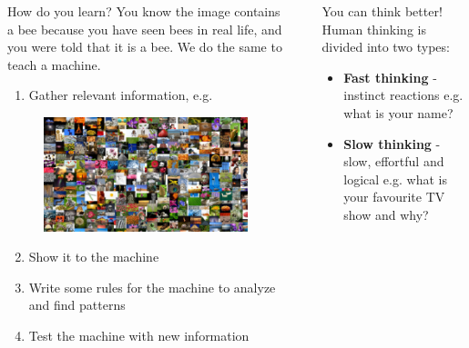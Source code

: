 \documentclass[final]{beamer}
\newlength{\sepwidth}
\newlength{\colwidth}
\newcommand{\separatorcolumn}{\begin{column}{\sepwidth}\end{column}}
\begin{document}
\begin{frame}{}
\begin{columns}[t]
\begin{column}{\colwidth}
    \begin{myblock}{How do you learn?} 
    You know the image contains a bee because you have seen bees in real life, and you were told that it is a bee. We do the same to teach a machine.
    \raggedright
    \begin{enumerate}
        \item Gather relevant information, e.g.
    \end{enumerate}
    \begin{figure}%
        \centering
        \includegraphics[width=\textwidth]{Images/data.jpg}
    \end{figure}
    \vspace{-0.5cm}
    \begin{enumerate}
        \setcounter{enumi}{1}
        \item Show it to the machine
        \item Write some rules for the machine to analyze and find patterns
        \item Test the machine with new information
    \end{enumerate}
    \end{myblock}
  
\end{column}
    
\separatorcolumn
\begin{column}{\colwidth}
    \vspace{-2cm}
    \begin{myblock}{You can think better!}
    Human thinking is divided into two types:
    \begin{itemize}
      \item \textbf{Fast thinking} - instinct reactions e.g. what is your name?
      \item \textbf{Slow thinking} - slow, effortful and logical e.g. what is your favourite TV show and why?
    \end{itemize}


\end{myblock}
\end{column}
\end{columns}
\end{frame}
\end{document}
